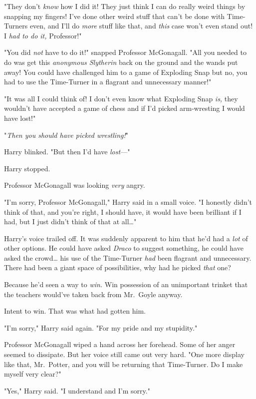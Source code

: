 "They don't \emph{know} how I did it! They just think I can do really weird
things by snapping my fingers! I've done other weird stuff that can't be done
with Time-Turners even, and I'll do \emph{more} stuff like that, and
\emph{this} case won't even stand out! I \emph{had to do it,} Professor!"

"You did \emph{not} have to do it!" snapped Professor McGonagall. "All you
needed to do was get this \emph{anonymous Slytherin} back on the ground and the
wands put away! You could have challenged him to a game of Exploding Snap but
no, you had to use the Time-Turner in a flagrant and unnecessary manner!"

"It was all I could think of! I don't even know what Exploding Snap \emph{is,}
they wouldn't have accepted a game of chess and if I'd picked arm-wresting I
would have lost!"

"\emph{Then you should have picked wrestling!}"

Harry blinked. "But then I'd have \emph{lost}---"

Harry stopped.

Professor McGonagall was looking \emph{very} angry.

"I'm sorry, Professor McGonagall," Harry said in a small voice. "I honestly
didn't think of that, and you're right, I should have, it would have been
brilliant if I had, but I just didn't think of that at all{\ldots}"

Harry's voice trailed off. It was suddenly apparent to him that he'd had a
\emph{lot} of other options. He could have asked \emph{Draco} to suggest
something, he could have asked the crowd{\ldots} his use of the Time-Turner
\emph{had} been flagrant and unnecessary. There had been a giant space of
possibilities, why had he picked \emph{that} one?

Because he'd seen a way to \emph{win.} Win possession of an unimportant trinket
that the teachers would've taken back from Mr.~Goyle anyway.

Intent to win. That was what had gotten him.

"I'm sorry," Harry said again. "For my pride and my stupidity."

Professor McGonagall wiped a hand across her forehead. Some of her anger seemed
to dissipate. But her voice still came out very hard. "One more display like
that, Mr.~Potter, and you will be returning that Time-Turner. Do I make myself
very clear?"

"Yes," Harry said. "I understand and I'm sorry."

